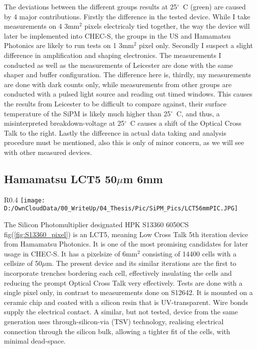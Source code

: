 \documentclass[12pt,article,type=msc,colorback,accentcolor=tud9c]{tudthesis}
\begin{document}
The deviations between the different groups results at 25${^\circ}$~C (green) are caused by 4 major contributions. Firstly the difference in the tested device. While I take measurements on 4 3mm$^2$ pixels electricaly tied together, the way the device will later be implemented into CHEC-S, the groups in the US\cite{US_CHECS} and Hamamatsu Photonics\cite{HPK_SiPM} are likely to run tests on 1 3mm$^2$ pixel only. Secondly I suspect a slight difference in amplification and shaping electronics. The measurements I conducted as well as the measurements of Leicester are done with the same shaper and buffer configuration. The difference here is, thirdly, my measurements are done with dark counts only, while measurements from other groups are conducted with a pulsed light source and reading out timed windows. This causes the results from Leicester to be difficult to compare against, their surface temperature of the SiPM is likely much higher than 25${^\circ}$~C, and thus, a misinterpreted breakdown-voltage at 25${^\circ}$~C causes a shift of the Optical Cross Talk to the right. Lastly the difference in actual data taking and analysis procedure must be mentioned, also this is only of minor concern, as we will see with other measured devices.






\clearpage
\subsection{Hamamatsu LCT5 50$\mu$m 6mm}
\label{subsec:LCT56}
\begin{wrapfigure}{R}{0.4\textwidth}
\centering
\texttt{[image: D:/OwnCloudData/00\_WriteUp/04\_Thesis/Pic/SiPM\_Pics/LCT56mmPIC.JPG]}
\caption{\label{fig:S13360_pixel}HPK S13360 6050CS pixel}
\end{wrapfigure}

The Silicon Photomultiplier designated HPK S13360 6050CS fig(\ref{fig:S13360_pixel}) is an LCT5, meaning Low Cross Talk 5th iteration device from Hamamatsu Photonics. It is one of the most promising candidates for later usage in CHEC-S. It has a pixelsize of 6mm$^2$ consisting of 14400 cells with a cellsize of 50$\mu$m. The present device and its similar iterations are the first to incorporate trenches bordering each cell, effectively insulating the cells and reducing the prompt Optical Cross Talk very effectively. Tests are done with a single pixel only, in contrast to measurements done on S12642. It is mounted on a ceramic chip and coated with a silicon resin that is UV-transparent. Wire bonds supply the electrical contact. A similar, but not tested, device from the same generation uses through-silicon-via (TSV) technology, realising electrical connection through the silicon bulk, allowing a tighter fit of the cells, with minimal dead-space.
\end{document}
